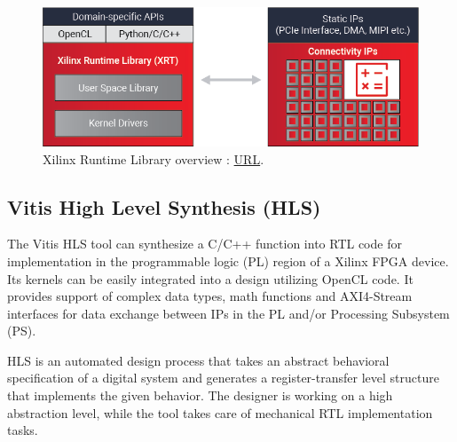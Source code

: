 \begin{figure}[H]
    \centering
        \includegraphics[width=1\textwidth]{Images/Platform/xrt.png}
        \decoRule
        \caption[Xilinx Runtime Library]{Xilinx Runtime Library overview \cite{Xilinx_Runtime_Library}: \href{https://www.xilinx.com/products/design-tools/vitis/xrt.html}{URL}.}
        \label{fig:XRT_overview}
\end{figure}

\subsection{Vitis High Level Synthesis (HLS)}
The Vitis HLS tool can synthesize a C/C++ function into RTL code for implementation in the programmable logic (PL) region of a Xilinx FPGA device. Its kernels can be easily integrated into a design utilizing OpenCL\cite{OpenCL} code. It provides support of complex data types, math functions and AXI4-Stream interfaces for data exchange between IPs in the PL and/or Processing Subsystem (PS).

HLS is an automated design process that takes an abstract behavioral specification of a digital system and generates a register-transfer level structure that implements the given behavior. The designer is working on a high abstraction level, while the tool takes care of mechanical RTL implementation tasks.

